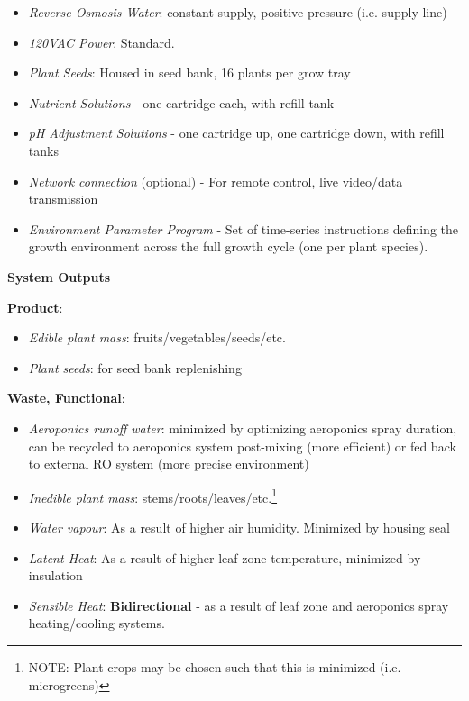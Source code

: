 \documentclass{report}
\begin{document}
\begin{itemize}
    \item \textit{Reverse Osmosis Water}: constant supply, positive pressure (i.e. supply line)
    \item \textit{120VAC Power}: Standard.
    \item \textit{Plant Seeds}: Housed in seed bank, 16 plants per grow tray
    \item \textit{Nutrient Solutions} - one cartridge each, with refill tank
    \item \textit{pH Adjustment Solutions} - one cartridge up, one cartridge down, with refill tanks
    \item \textit{Network connection} (optional) - For remote control, live video/data transmission
    \item \textit{Environment Parameter Program} - Set of time-series instructions defining the growth environment across the full growth cycle (one per plant species).
\end{itemize}


\textbf{System Outputs}




\textbf{Product}:

\begin{itemize}
    \item \textit{Edible plant mass}: fruits/vegetables/seeds/etc.
    \item \textit{Plant seeds}: for seed bank replenishing
\end{itemize}

\textbf{Waste, Functional}:

\begin{itemize}
    \item \textit{Aeroponics runoff water}: minimized by optimizing aeroponics spray duration, can be recycled to aeroponics system post-mixing (more efficient) or fed back to external RO system (more precise environment)
    \item \textit{Inedible plant mass}: stems/roots/leaves/etc.\footnote{NOTE: Plant crops may be chosen such that this is minimized (i.e. microgreens)}
    \item \textit{Water vapour}: As a result of higher air humidity. Minimized by housing seal
    \item \textit{Latent Heat}: As a result of higher leaf zone temperature, minimized by insulation
    \item \textit{Sensible Heat}: \textbf{Bidirectional} - as a result of leaf zone and aeroponics spray heating/cooling systems.
\end{itemize}
\end{document}
